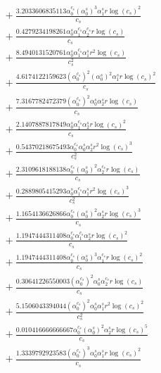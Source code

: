 \documentclass[10pt]{article}
\begin{document}
\begin{align*}
&{}  + \frac{3.2033606835113 \alpha_{0}^{c_s} \left(\alpha_{0}^s\right)^{3} \alpha_{1}^s r \log{\left(c_{s} \right)}^{2}}{c_{s}} \\
&{}  + \frac{0.4279234198261 \alpha_{0}^s \alpha_{1}^{c_s} \alpha_{2}^{c_s} r \log{\left(c_{s} \right)}}{c_{s}} \\
&{}  + \frac{8.4940131520761 \alpha_{0}^s \alpha_{1}^{c_s} \alpha_{1}^s r^{2} \log{\left(c_{s} \right)}}{c_{s}^{2}} \\
&{}  + \frac{4.6174122159623 \left(\alpha_{0}^{c_s}\right)^{2} \left(\alpha_{0}^s\right)^{2} \alpha_{1}^s r \log{\left(c_{s} \right)}^{2}}{c_{s}} \\
&{}  + \frac{7.3167782472379 \left(\alpha_{0}^{c_s}\right)^{2} \alpha_{0}^s \alpha_{2}^s r \log{\left(c_{s} \right)}}{c_{s}} \\
&{}  + \frac{2.1407887817849 \alpha_{0}^s \alpha_{1}^{c_s} \alpha_{2}^s r \log{\left(c_{s} \right)}^{2}}{c_{s}} \\
&{}  + \frac{0.54370218675493 \alpha_{0}^{c_s} \alpha_{0}^s \alpha_{2}^s r^{2} \log{\left(c_{s} \right)}^{3}}{c_{s}^{2}} \\
&{}  + \frac{2.3109618188138 \alpha_{0}^{c_s} \left(\alpha_{0}^s\right)^{2} \alpha_{2}^{c_s} r \log{\left(c_{s} \right)}}{c_{s}} \\
&{}  + \frac{0.2889805415293 \alpha_{0}^s \alpha_{1}^{c_s} \alpha_{1}^s r^{2} \log{\left(c_{s} \right)}^{3}}{c_{s}^{2}} \\
&{}  + \frac{1.1654136626866 \alpha_{0}^{c_s} \left(\alpha_{0}^s\right)^{2} \alpha_{2}^s r \log{\left(c_{s} \right)}^{3}}{c_{s}} \\
&{}  + \frac{1.1947444311408 \alpha_{0}^{c_s} \alpha_{1}^{c_s} \alpha_{2}^s r \log{\left(c_{s} \right)}^{2}}{c_{s}} \\
&{}  + \frac{1.1947444311408 \alpha_{0}^{c_s} \left(\alpha_{0}^s\right)^{3} \alpha_{1}^{c_s} r \log{\left(c_{s} \right)}^{2}}{c_{s}} \\
&{}  + \frac{0.30641226550003 \left(\alpha_{0}^{c_s}\right)^{2} \alpha_{0}^s \alpha_{2}^{c_s} r \log{\left(c_{s} \right)}}{c_{s}} \\
&{}  + \frac{5.1506043394044 \left(\alpha_{0}^{c_s}\right)^{2} \alpha_{0}^s \alpha_{1}^s r^{2} \log{\left(c_{s} \right)}^{2}}{c_{s}^{2}} \\
&{}  + \frac{0.010416666666667 \alpha_{0}^{c_s} \left(\alpha_{0}^s\right)^{2} \alpha_{2}^s r \log{\left(c_{s} \right)}^{5}}{c_{s}} \\
&{}  + \frac{1.3339792923583 \left(\alpha_{0}^{c_s}\right)^{3} \alpha_{0}^s \alpha_{1}^s r \log{\left(c_{s} \right)}^{2}}{c_{s}} \\

\end{align*}
\end{document}
